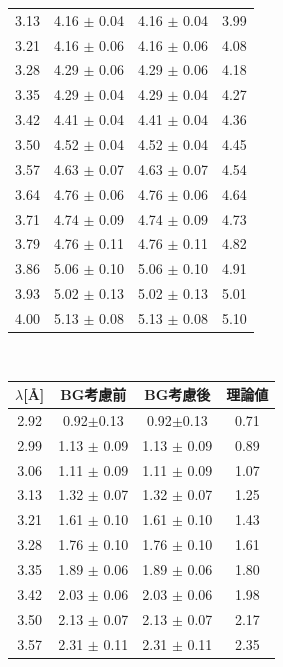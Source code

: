 \begin{table}[H]
\begin{minipage}{0.5\hsize}
\begin{tabular}{cccc}
3.13 	&	4.16 	$\pm$	0.04 	&	4.16 	$\pm$	0.04 	&	3.99 	\\
3.21 	&	4.16 	$\pm$	0.06 	&	4.16 	$\pm$	0.06 	&	4.08 	\\
3.28 	&	4.29 	$\pm$	0.06 	&	4.29 	$\pm$	0.06 	&	4.18 	\\
3.35 	&	4.29 	$\pm$	0.04 	&	4.29 	$\pm$	0.04 	&	4.27 	\\
3.42 	&	4.41 	$\pm$	0.04 	&	4.41 	$\pm$	0.04 	&	4.36 	\\
3.50 	&	4.52 	$\pm$	0.04 	&	4.52 	$\pm$	0.04 	&	4.45 	\\
3.57 	&	4.63 	$\pm$	0.07 	&	4.63 	$\pm$	0.07 	&	4.54 	\\
3.64 	&	4.76 	$\pm$	0.06 	&	4.76 	$\pm$	0.06 	&	4.64 	\\
3.71 	&	4.74 	$\pm$	0.09 	&	4.74 	$\pm$	0.09 	&	4.73 	\\
3.79 	&	4.76 	$\pm$	0.11 	&	4.76 	$\pm$	0.11 	&	4.82 	\\
3.86 	&	5.06 	$\pm$	0.10 	&	5.06 	$\pm$	0.10 	&	4.91 	\\
3.93 	&	5.02 	$\pm$	0.13 	&	5.02 	$\pm$	0.13 	&	5.01 	\\
4.00 	&	5.13 	$\pm$	0.08 	&	5.13 	$\pm$	0.08 	&	5.10 	\\ \hline
\end{tabular}
\vspace{5mm}
\end{minipage}\\
\begin{minipage}{0.5\hsize}
\centering
\begin{tabular}{cccc}
$\lambda$[\AA]&BG考慮前&BG考慮後&理論値\\ \hline
2.92&0.92$\pm$0.13&0.92$\pm$0.13&0.71\\
2.99 	&	1.13 	$\pm$	0.09 	&	1.13 	$\pm$	0.09 	&	0.89 	\\
3.06 	&	1.11 	$\pm$	0.09 	&	1.11 	$\pm$	0.09 	&	1.07 	\\
3.13 	&	1.32 	$\pm$	0.07 	&	1.32 	$\pm$	0.07 	&	1.25 	\\
3.21 	&	1.61 	$\pm$	0.10 	&	1.61 	$\pm$	0.10 	&	1.43 	\\
3.28 	&	1.76 	$\pm$	0.10 	&	1.76 	$\pm$	0.10 	&	1.61 	\\
3.35 	&	1.89 	$\pm$	0.06 	&	1.89 	$\pm$	0.06 	&	1.80 	\\
3.42 	&	2.03 	$\pm$	0.06 	&	2.03 	$\pm$	0.06 	&	1.98 	\\
3.50 	&	2.13 	$\pm$	0.07 	&	2.13 	$\pm$	0.07 	&	2.17 	\\
3.57 	&	2.31 	$\pm$	0.11 	&	2.31 	$\pm$	0.11 	&	2.35 	\\

\end{tabular}
\end{minipage}
\end{table}
